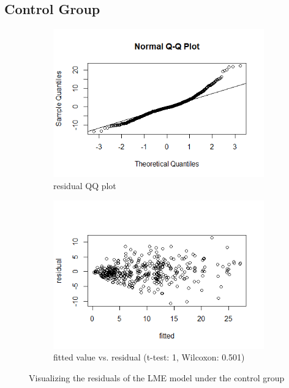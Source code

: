 \subsection{Control Group}
\begin{figure}[H]
\begin{subfigure}{.5\textwidth}
  \centering
  \includegraphics[width=1\linewidth]{../../plots/qq_residual_control.png}
  \caption{residual QQ plot}
\end{subfigure}
\begin{subfigure}{.5\textwidth}
  \centering
  \includegraphics[width=1\linewidth]{../../plots/residual_control.png}
  \caption{fitted value vs. residual (t-test: 1, Wilcoxon: 0.501)}
\end{subfigure}
\caption{Visualizing the residuals of the LME model under the control group}
\label{fig:residual.control}
\end{figure}

